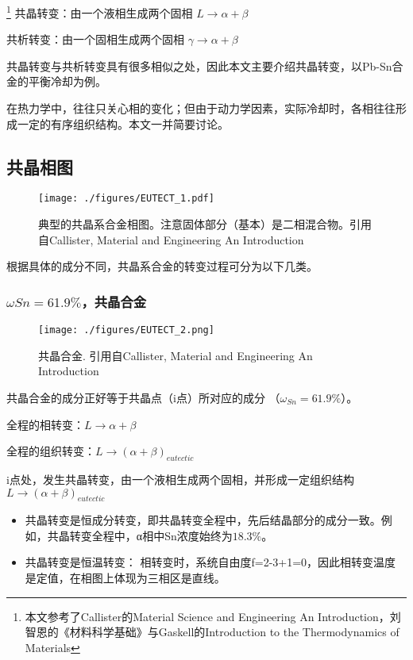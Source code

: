 
\footnote{本文参考了Callister的Material Science and Engineering An Introduction，刘智恩的《材料科学基础》与Gaskell的Introduction to the Thermodynamics of Materials}
共晶转变：由一个液相生成两个固相 $L \rightarrow \alpha+\beta$

共析转变：由一个固相生成两个固相 $\gamma \rightarrow \alpha+\beta$

共晶转变与共析转变具有很多相似之处，因此本文主要介绍共晶转变，以Pb-Sn合金的平衡冷却为例。

在热力学中，往往只关心相的变化；但由于动力学因素，实际冷却时，各相往往形成一定的有序组织结构。本文一并简要讨论。

\subsection{共晶相图}
\begin{figure}[ht]
\centering
\texttt{[image: ./figures/EUTECT\_1.pdf]}
\caption{典型的共晶系合金相图。注意固体部分（基本）是二相混合物。引用自Callister, Material and Engineering An Introduction} \label{EUTECT_fig1}
\end{figure}
根据具体的成分不同，共晶系合金的转变过程可分为以下几类。

\subsubsection{$\omega Sn=61.9\%$，共晶合金}
\begin{figure}[ht]
\centering
\texttt{[image: ./figures/EUTECT\_2.png]}
\caption{共晶合金. 引用自Callister, Material and Engineering An Introduction} \label{EUTECT_fig2}
\end{figure}

共晶合金的成分正好等于共晶点（i点）所对应的成分 （$\omega_{Sn}=61.9\%$）。

全程的相转变：$L \rightarrow \alpha+\beta$

全程的组织转变：$L \rightarrow (\alpha+\beta)_{eutectic}$

i点处，发生共晶转变，由一个液相生成两个固相，并形成一定组织结构 $L \rightarrow (\alpha+\beta)_{eutectic}$
\begin{itemize}
\item 共晶转变是恒成分转变，即共晶转变全程中，先后结晶部分的成分一致。例如，共晶转变全程中，α相中Sn浓度始终为$18.3\%$。
\item 共晶转变是恒温转变： 相转变时，系统自由度f=2-3+1=0，因此相转变温度是定值，在相图上体现为三相区是直线。
\end{itemize}

